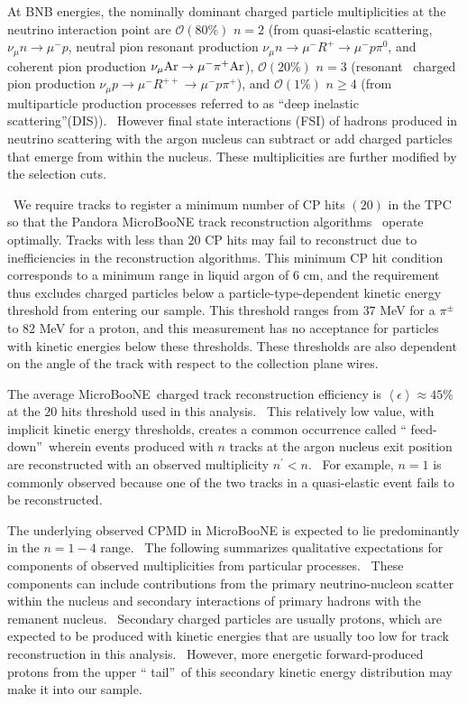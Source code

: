 \documentclass{article}
\begin{document}
At BNB energies, the nominally dominant charged particle multiplicities at
the neutrino interaction point are $\mathcal{O}\left( 80\%\right) $ $%
n=2$ (from quasi-elastic scattering, $\nu_{\mu}n\rightarrow\mu^{-}p$,
neutral pion resonant production $\nu_{\mu}n\rightarrow\mu^{-}R^{+}%
\rightarrow\mu^{-}p\pi^{0}$, and coherent pion production $\nu_{\mu}\mathrm{%
Ar}\rightarrow \mu^{-}\pi^{+}\mathrm{Ar}$), $\mathcal{O}\left( 20\%\right) $ 
$n=3$ (resonant \ charged pion production $\nu_{\mu}p\rightarrow%
\mu^{-}R^{++}\rightarrow\mu^{-}p\pi^{+}$), and $\mathcal{O}\left( 1\%\right) 
$ $n\geq4$ (from multiparticle production processes referred to as
\textquotedblleft deep inelastic scattering\textquotedblright (DIS)). \ However final state interactions
(FSI) of hadrons produced in neutrino scattering with the argon nucleus can
subtract or add charged particles that emerge from within the nucleus. These multiplicities are further modified by the selection cuts.

\ We require tracks to register a minimum number of CP hits $(20)$ in the TPC
so that the Pandora MicroBooNE track reconstruction algorithms~\cite{Pandora
reference} operate optimally. Tracks with less than $20$ CP hits may fail to reconstruct due to inefficiencies in the reconstruction algorithms. This minimum CP hit condition corresponds to a
minimum range in liquid argon of 6 cm, and the requirement thus excludes
charged particles below a particle-type-dependent kinetic energy threshold
from entering our sample. This threshold ranges from $37$ MeV for a $%
\pi^{\pm }$ to $82$ MeV for a proton, and this measurement has no acceptance
for particles with kinetic energies below these thresholds. These thresholds are also dependent on the angle of the track with respect to the collection plane wires. 

The average MicroBooNE\ charged track reconstruction efficiency is $%
\left\langle \epsilon \right\rangle \approx 45\%$~\cite{DocDB5987-Pandora-PUB} at the $20$ hits threshold
used in this analysis. \ This relatively low
value, with implicit kinetic
energy thresholds, creates a common occurrence called \textquotedblleft
feed-down\textquotedblright\ wherein events produced with $n$ tracks at the
argon nucleus exit position are reconstructed with an observed multiplicity $%
n^{\prime }<n$. \ For example, $n=1$ is commonly observed because one of the
two tracks in a quasi-elastic event fails to be reconstructed. \ 

The underlying observed CPMD in MicroBooNE is expected to lie predominantly in
the $n=1-4$ range. \ The following summarizes qualitative expectations for
components of observed multiplicities from particular processes. \ These
components can include contributions from the primary neutrino-nucleon scatter
within the nucleus and secondary interactions of primary hadrons with the
remanent nucleus. \ Secondary charged particles are usually protons, which are
expected to be produced with kinetic energies that are usually too low for track reconstruction in this analysis. \ However, more energetic
forward-produced protons from the upper \textquotedblleft
tail\textquotedblright\ of this secondary kinetic energy distribution may make
it into our sample.
\end{document}

